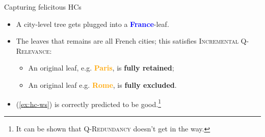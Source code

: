 \documentclass[10pt]{beamer}
\newcommand{\stronger}[1]{\textbf{\textcolor{orange}{#1}}}
\newcommand{\Paris}{\textbf{\textcolor{orange}{Paris}}}
\newcommand{\France}{\textbf{\textcolor{blue}{France}}}
\begin{document}
\begin{frame}{Capturing felicitous HCs}
\begin{minipage}{.55\linewidth}
\begin{itemize}
			\item A city-level tree gets plugged into a \France-leaf.
			\item The leaves that remains are all French cities; this satisfies \textsc{Incremental Q-Relevance}:
			\begin{itemize}
				\item An original leaf, e.g. \Paris, is \textbf{fully retained};
				\item An original leaf e.g. \stronger{Rome}, is \textbf{fully excluded}.
			\end{itemize}
			\item (\ref{ex:hc-ws}) is correctly predicted to be good.\footnote{It can be shown that \textsc{Q-Redundancy} doesn't get in the way.}
		\end{itemize}
	\end{minipage}
\end{frame}
\end{document}

